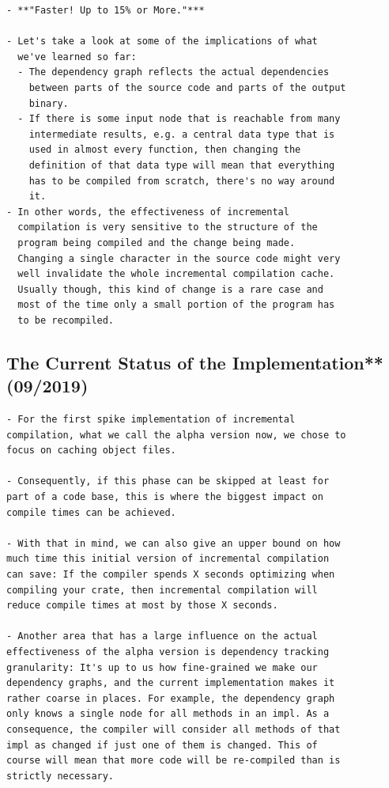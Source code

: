 \documentclass[12pt, a4paper]{report}
\begin{document}
\begin{verbatim}
- **"Faster! Up to 15% or More."***

- Let's take a look at some of the implications of what
  we've learned so far:
  - The dependency graph reflects the actual dependencies
    between parts of the source code and parts of the output
    binary.
  - If there is some input node that is reachable from many
    intermediate results, e.g. a central data type that is
    used in almost every function, then changing the
    definition of that data type will mean that everything
    has to be compiled from scratch, there's no way around
    it.
- In other words, the effectiveness of incremental
  compilation is very sensitive to the structure of the
  program being compiled and the change being made.
  Changing a single character in the source code might very
  well invalidate the whole incremental compilation cache.
  Usually though, this kind of change is a rare case and
  most of the time only a small portion of the program has
  to be recompiled.
\end{verbatim}
\cite{rust_blog_incremental_compilation}

\subsection*{The Current Status of the Implementation** (09/2019)}

\begin{verbatim}
- For the first spike implementation of incremental
compilation, what we call the alpha version now, we chose to
focus on caching object files.

- Consequently, if this phase can be skipped at least for
part of a code base, this is where the biggest impact on
compile times can be achieved.

- With that in mind, we can also give an upper bound on how
much time this initial version of incremental compilation
can save: If the compiler spends X seconds optimizing when
compiling your crate, then incremental compilation will
reduce compile times at most by those X seconds.

- Another area that has a large influence on the actual
effectiveness of the alpha version is dependency tracking
granularity: It's up to us how fine-grained we make our
dependency graphs, and the current implementation makes it
rather coarse in places. For example, the dependency graph
only knows a single node for all methods in an impl. As a
consequence, the compiler will consider all methods of that
impl as changed if just one of them is changed. This of
course will mean that more code will be re-compiled than is
strictly necessary.
\end{verbatim}
\cite{rust_blog_incremental_compilation}
\end{document}
